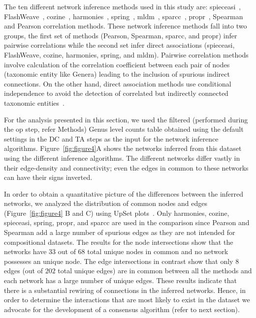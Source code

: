   The ten different network inference methods used in this study are: \ac{spieceasi}~\cite{Kurtz2015}, FlashWeave~\cite{tackmannRapidInferenceDirect2019}, \ac{cozine}~\cite{haCompositionalZeroinflatedNetwork2020a}, \ac{harmonies}~\cite{jiangHARMONIESHybridApproach2020}, \ac{spring}~\cite{yoonMicrobialNetworksSPRING2019}, \ac{mldm}~\cite{Yang2017}, \ac{sparcc}~\cite{Friedman2012,Watts2018}, propr~\cite{quinnProprRpackageIdentifying2017}, Spearman and Pearson correlation methods.
  These network inference methods fall into two groups, the first set of methods (Pearson, Spearman, \ac{sparcc}, and propr) infer pairwise correlations while the second set infer direct associations (\ac{spieceasi}, FlashWeave, \ac{cozine}, \ac{harmonies}, \ac{spring}, and \ac{mldm}).
  Pairwise correlation methods involve calculation of the correlation coefficient between each pair of nodes (taxonomic entity like Genera) leading to the inclusion of spurious indirect connections.
  On the other hand, direct association methods use conditional independence to avoid the detection of correlated but indirectly connected taxonomic entities~\cite{Kurtz2015,Menon2018}.

  For the analysis presented in this section, we used the filtered (performed during the \ac{op} step, refer Methods) Genus level counts table obtained using the default settings in the DC and TA steps as the input for the network inference algorithms.
  Figure~\ref{fig:figure4}A shows the networks inferred from this dataset using the different inference algorithms.
  The different networks differ vastly in their edge-density and connectivity; even the edges in common to these networks can have their signs inverted.

  In order to obtain a quantitative picture of the differences between the inferred networks, we analyzed the distribution of common nodes and edges (Figure~\ref{fig:figure4} B and C) using UpSet plots~\cite{Lex}.
  Only \ac{harmonies}, \ac{cozine}, \ac{spieceasi}, \ac{spring}, propr, and \ac{sparcc} are used in the comparison since Pearson and Spearman add a large number of spurious edges as they are not intended for compositional datasets.
  The results for the node intersections show that the networks have $33$ out of $68$ total unique nodes in common and no network possesses an unique node.
  The edge intersections in contrast show that only $8$ edges (out of $202$ total unique edges) are in common between all the methods and each network has a large number of unique edges.
  These results indicate that there is a substantial rewiring of connections in the inferred networks.
  Hence, in order to determine the interactions that are most likely to exist in the dataset we advocate for the development of a consensus algorithm (refer to next section).

